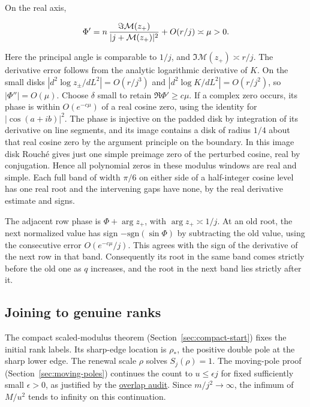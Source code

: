 \documentclass[11pt]{article}
\begin{document}
On the real axis,

\begin{equation*}
\Phi'=n\thinspace \frac{\Im\mathcal M(z_+)}{|j+\mathcal M(z_+)|^2}+O(r/j)\asymp \mu>0 .
\end{equation*}

Here the principal angle is comparable to \(1/j\), and \(\Im\mathcal M(z_+)\asymp r/j\). The derivative error follows from the analytic logarithmic derivative of \(K\). On the small disks \(|d^2\log z_\pm/dL^2|=O(r/j^3)\) and \(|d^2\log K/dL^2|=O(r/j^2)\), so \(|\Phi''|=O(\mu)\). Choose \(\delta\) small to retain \(\Re\Phi'\ge c\mu\). If a complex zero occurs, its phase is within \(O(e^{-c\mu})\) of a real cosine zero, using the identity for \(|\cos(a+ib)|^2\). The phase is injective on the padded disk by integration of its derivative on line segments, and its image contains a disk of radius \(1/4\) about that real cosine zero by the argument principle on the boundary. In this image disk Rouché gives just one simple preimage zero of the perturbed cosine, real by conjugation. Hence all polynomial zeros in these modulus windows are real and simple. Each full band of width \(\pi/6\) on either side of a half-integer cosine level has one real root and the intervening gaps have none, by the real derivative estimate and signs.

The adjacent row phase is \(\Phi+\arg z_+\), with \(\arg z_+\asymp 1/j\). At an old root, the next normalized value has sign \(-\mathrm{sgn}(\sin\Phi)\) by subtracting the old value, using the consecutive error \(O(e^{-c\mu}/j)\). This agrees with the sign of the derivative of the next row in that band. Consequently its root in the same band comes strictly before the old one as \(q\) increases, and the root in the next band lies strictly after it.

\subsection{Joining to genuine ranks}
\label{sec:joining-to-genuine-ranks}

The compact scaled-modulus theorem (Section~\ref{sec:compact-start}) fixes the initial rank labels. Its sharp-edge location is \(\rho_*\), the positive double pole at the sharp lower edge. The renewal scale \(\rho\) solves \(S_j(\rho)=1\). The moving-pole proof (Section~\ref{sec:moving-poles}) continues the count to \(u\le\epsilon j\) for fixed sufficiently small \(\epsilon>0\), as justified by the \href{https://github.com/ProgramComputer/open-math-research/blob/8624d14aef697bf2b515881bdda873228c0b5b50/topics/ordered-large-blocks/growing-outer-ranks/review-pole-overlap.md}{overlap audit}. Since \(m/j^2\to\infty\), the infimum of \(M/u^2\) tends to infinity on this continuation.
\end{document}
